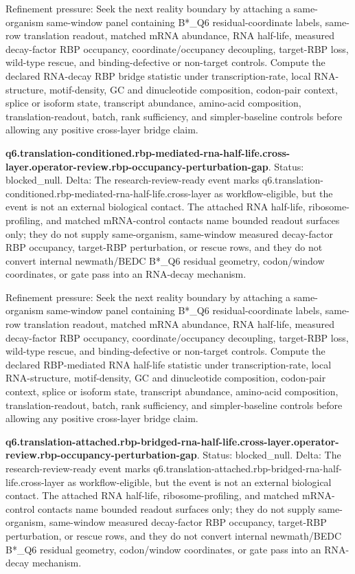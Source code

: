 Refinement pressure: Seek the next reality boundary by attaching a same-organism same-window panel containing B*\_Q6 residual-coordinate labels, same-row translation readout, matched mRNA abundance, RNA half-life, measured decay-factor RBP occupancy, coordinate/occupancy decoupling, target-RBP loss, wild-type rescue, and binding-defective or non-target controls. Compute the declared RNA-decay RBP bridge statistic under transcription-rate, local RNA-structure, motif-density, GC and dinucleotide composition, codon-pair context, splice or isoform state, transcript abundance, amino-acid composition, translation-readout, batch, rank sufficiency, and simpler-baseline controls before allowing any positive cross-layer bridge claim.

\textbf{q6.translation-conditioned.rbp-mediated-rna-half-life.cross-layer.operator-review.rbp-occupancy-perturbation-gap}. Status: blocked\_null. Delta: The research-review-ready event marks q6.translation-conditioned.rbp-mediated-rna-half-life.cross-layer as workflow-eligible, but the event is not an external biological contact. The attached RNA half-life, ribosome-profiling, and matched mRNA-control contacts name bounded readout surfaces only; they do not supply same-organism, same-window measured decay-factor RBP occupancy, target-RBP perturbation, or rescue rows, and they do not convert internal newmath/BEDC B*\_Q6 residual geometry, codon/window coordinates, or gate pass into an RNA-decay mechanism.

Refinement pressure: Seek the next reality boundary by attaching a same-organism same-window panel containing B*\_Q6 residual-coordinate labels, same-row translation readout, matched mRNA abundance, RNA half-life, measured decay-factor RBP occupancy, coordinate/occupancy decoupling, target-RBP loss, wild-type rescue, and binding-defective or non-target controls. Compute the declared RBP-mediated RNA half-life statistic under transcription-rate, local RNA-structure, motif-density, GC and dinucleotide composition, codon-pair context, splice or isoform state, transcript abundance, amino-acid composition, translation-readout, batch, rank sufficiency, and simpler-baseline controls before allowing any positive cross-layer bridge claim.

\textbf{q6.translation-attached.rbp-bridged-rna-half-life.cross-layer.operator-review.rbp-occupancy-perturbation-gap}. Status: blocked\_null. Delta: The research-review-ready event marks q6.translation-attached.rbp-bridged-rna-half-life.cross-layer as workflow-eligible, but the event is not an external biological contact. The attached RNA half-life, ribosome-profiling, and matched mRNA-control contacts name bounded readout surfaces only; they do not supply same-organism, same-window measured decay-factor RBP occupancy, target-RBP perturbation, or rescue rows, and they do not convert internal newmath/BEDC B*\_Q6 residual geometry, codon/window coordinates, or gate pass into an RNA-decay mechanism.

